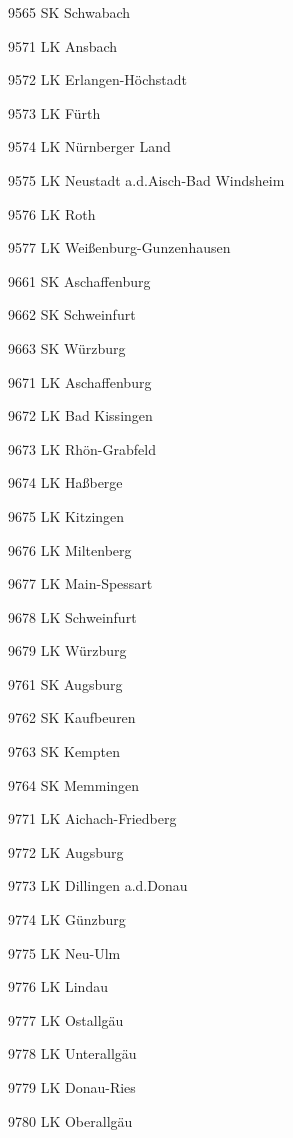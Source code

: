 9565  SK Schwabach

9571  LK Ansbach

9572  LK Erlangen-Höchstadt

9573  LK Fürth

9574  LK Nürnberger Land

9575  LK Neustadt a.d.Aisch-Bad Windsheim

9576  LK Roth

9577  LK Weißenburg-Gunzenhausen

9661  SK Aschaffenburg

9662  SK Schweinfurt

9663  SK Würzburg

9671  LK Aschaffenburg

9672  LK Bad Kissingen

9673  LK Rhön-Grabfeld

9674  LK Haßberge

9675  LK Kitzingen

9676  LK Miltenberg

9677  LK Main-Spessart

9678  LK Schweinfurt

9679  LK Würzburg

9761  SK Augsburg

9762  SK Kaufbeuren

9763  SK Kempten

9764  SK Memmingen

9771  LK Aichach-Friedberg

9772  LK Augsburg

9773  LK Dillingen a.d.Donau

9774  LK Günzburg

9775  LK Neu-Ulm

9776  LK Lindau

9777  LK Ostallgäu

9778  LK Unterallgäu

9779  LK Donau-Ries

9780  LK Oberallgäu

